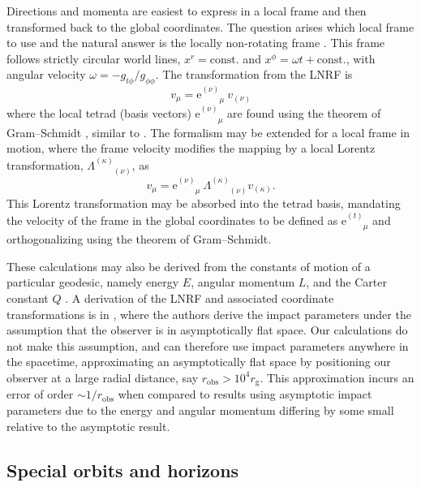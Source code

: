 \documentclass[fleqn,usenatbib]{mnras}
\newcommand{\e}{\text{e}}
\newcommand{\rg}{r_\text{g}}
\newcommand{\utensor}[3]{#1^{#2}_{\phantom{#2}#3}}
\begin{document}
Directions and momenta are easiest to express in a local frame and then
transformed back to the global coordinates. The question arises which local
frame to use and the natural answer is the locally non-rotating frame
\citep[LNRF;][]{bardeen_rotating_1972}. This frame follows strictly circular
world lines, $x^r = \text{const.}$ and $x^\phi = \omega t + \text{const.}$,
with angular velocity $\omega = -g_{t\phi} / g_{\phi\phi}$. The transformation
from the LNRF is
\begin{equation}
    \label{eq:local-to-global-velocity}
    v_\mu = \e^{(\nu)}_{\phantom{(\nu)}\mu}\  v_{(\nu)}
\end{equation}
where the local tetrad (basis vectors) $\e^{(\nu)}_{\phantom{(\nu)}\mu}$ are
found using the theorem of Gram--Schmidt
\citep[][Appendix~\ref{appendix:gram-schmidt}]{schmidt_uber_1989}, similar to
\citet{wilkins_2020_isco}. The formalism
may be extended for a local frame in motion, where the frame velocity modifies
the mapping by a local Lorentz transformation,
$\Lambda^{(\kappa)}_{\phantom{(\kappa)}(\nu)}$, as
\begin{equation}
    v_\mu = \e^{(\nu)}_{\phantom{(\nu)}\mu}\  \Lambda^{(\kappa)}_{\phantom{(a)}(\nu)} v_{(\kappa)}.
\end{equation}
This Lorentz transformation may be absorbed into the tetrad basis, mandating the
velocity of the frame in the global coordinates to be defined as
$\utensor{\e}{(t)}{\mu}$ and orthogonalizing using the theorem of Gram--Schmidt.

These calculations may also be derived from the constants of motion of a
particular geodesic, namely energy $E$, angular momentum $L$, and the Carter
constant $Q$ \citep{carter_global_1968}. A derivation of the LNRF and associated
coordinate transformations is in \citet{cunningham_optical_1973}, where the
authors derive the impact parameters under the assumption that the observer is
in asymptotically flat space. Our calculations do not make this assumption, and
can therefore use impact parameters anywhere in the spacetime, approximating an
asymptotically flat space by positioning our observer at a large radial
distance, say $r_\text{obs} > 10^4 \rg$. This approximation incurs an error of
order $\sim1/r_\text{obs}$ when compared to results using asymptotic impact
parameters due to the energy and angular momentum differing by some small
relative to the asymptotic result.

\subsection{Special orbits and horizons}
\label{sec:special-orbits}
\end{document}

